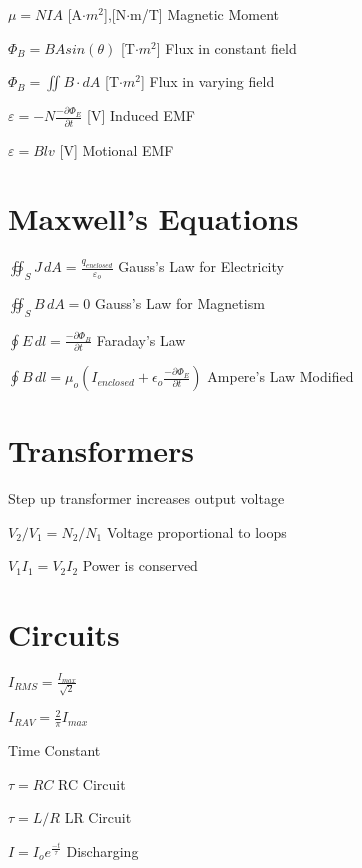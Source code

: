 \documentclass{article}
\begin{document}
\LARGE{$\mu=NIA$}
\large{[A$\cdot{m^2}$],[N$\cdot$m/T]}
\large Magnetic Moment

\LARGE{$\Phi_B=BAsin(\theta)$}
\large{[T$\cdot{m^2}$]}
\large Flux in constant field

\LARGE{$\Phi_B=\iint B\cdot{dA}$}
\large{[T$\cdot{m^2}$]}
\large Flux in varying field

\LARGE{$\varepsilon=-N\frac{-\partial\Phi_E}{\partial{t}}$}
\large{[V]}
\large Induced EMF

\LARGE{$\varepsilon=Blv$}
\large{[V]}
\large Motional EMF

\vspace{.2cm}

\section{Maxwell's Equations}

\LARGE ${\oiint_S J \,dA = \frac
{q_{enclosed}}
{\varepsilon_o }}$
\large Gauss's Law for Electricity

\LARGE ${\oiint_S B \,dA = 0}$
\large Gauss's Law for Magnetism

\LARGE$\oint E \,dl =
\frac{-\partial\Phi_B}{\partial{t}}$
\large{Faraday's Law}

\LARGE$\oint B \,dl = \mu_o(I_{enclosed}+\epsilon_o
\frac{-\partial\Phi_E}{\partial{t}})$
\large {Ampere's Law Modified}


\section {Transformers}
\large {Step up transformer increases output voltage }

\LARGE$V_2/V_1=N_2/N_1$
\large {Voltage proportional to loops}

\LARGE$V_1I_1=V_2I_2$
\large {Power is conserved}



\section{Circuits}

\LARGE $I_{RMS}=\frac{I_{max}}{\sqrt{2}}$

\LARGE $I_{RAV}=\frac{2}{\pi}I_{max}$

\Large {Time Constant}

\LARGE$\tau = RC$
\large{RC Circuit}

\LARGE$\tau = L/R$
\large{LR Circuit}

\LARGE$I = I_o{e^{\frac{-t}{\tau}}}$
\large{Discharging}
\end{document}
